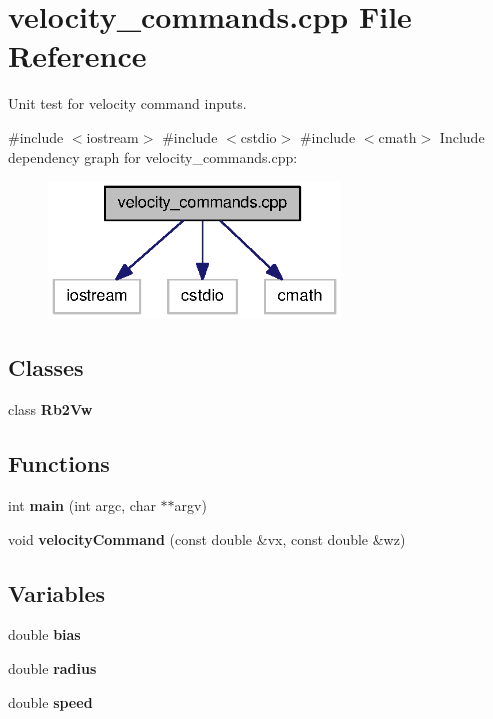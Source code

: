 \section{velocity\-\_\-commands.\-cpp \-File \-Reference}
\label{velocity__commands_8cpp}


\-Unit test for velocity command inputs.  


{\ttfamily \#include $<$iostream$>$}\*
{\ttfamily \#include $<$cstdio$>$}\*
{\ttfamily \#include $<$cmath$>$}\*
\-Include dependency graph for velocity\-\_\-commands.\-cpp\-:
\nopagebreak
\begin{figure}[H]
\begin{center}
\leavevmode
\includegraphics[width=220pt]{velocity__commands_8cpp__incl}
\end{center}
\end{figure}
\subsection*{\-Classes}
\begin{DoxyCompactItemize}
\item 
class {\bf \-Rb2\-Vw}
\end{DoxyCompactItemize}
\subsection*{\-Functions}
\begin{DoxyCompactItemize}
\item 
int {\bf main} (int argc, char $\ast$$\ast$argv)
\item 
void {\bf velocity\-Command} (const double \&vx, const double \&wz)
\end{DoxyCompactItemize}
\subsection*{\-Variables}
\begin{DoxyCompactItemize}
\item 
double {\bf bias}
\item 
double {\bf radius}
\item 
double {\bf speed}
\end{DoxyCompactItemize}


